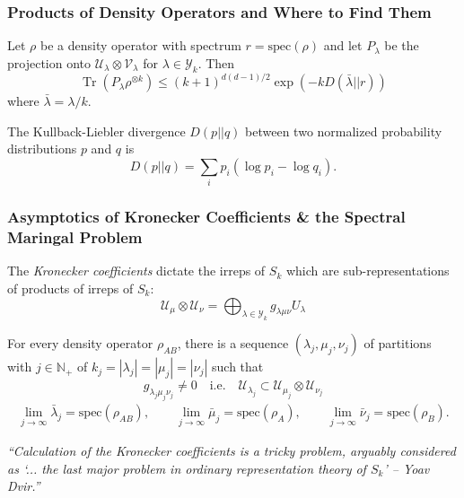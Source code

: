\documentclass[
    9pt,
    hyperref={bookmarks=false, colorlinks=false}, %
    xcolor={dvipsnames},
]{beamer}
\DeclareMathOperator{\Tr}{Tr}
\begin{document}
\begin{frame}
    \frametitle{Products of Density Operators and Where to Find Them}
    \begin{theorem}
        Let $\rho$ be a density operator with spectrum $r = \mathrm{spec}(\rho)$ and let $P_\lambda$ be the projection onto $\mathcal U_\lambda \otimes \mathcal V_\lambda$ for $\lambda \in \mathcal Y_k$. Then
        \[ \Tr ( P_\lambda \rho^{\otimes k} ) \leq (k + 1)^{d(d-1)/2} \exp ( - k D(\bar \lambda || r  )) \]
        where $\bar \lambda = \lambda / k$.
    \end{theorem}
    \begin{definition}[KL Divergence]
        The Kullback-Liebler divergence $D(p ||q)$ between two normalized probability distributions $p$ and $q$ is
        \[ D(p || q) = {\sum}_{i} p_i ( \log p_i - \log q_i ). \]
    \end{definition}
\end{frame}

\begin{frame}
    \frametitle{Asymptotics of Kronecker Coefficients \& the Spectral Maringal Problem}
    \begin{definition}
        The \textit{Kronecker coefficients} dictate the irreps of $S_k$ which are sub-representations of products of irreps of $S_k$:
        \[ \mathcal U_{\mu} \otimes \mathcal U_{\nu}  = {\bigoplus}_{\lambda \in \mathcal Y_k} g_{\lambda \mu \nu} U_{\lambda} \]
    \end{definition}
    \begin{theorem}
        For every density operator $\rho_{AB}$, there is a sequence $(\lambda_j, \mu_j, \nu_j)$ of partitions with $j \in \mathbb N_+$ of $k_j = |\lambda_j| = |\mu_j| = |\nu_j|$ such that 
        \[ g_{\lambda_j \mu_j \nu_j} \neq 0 \quad \text{i.e.} \quad \mathcal U_{\lambda_j} \subset \mathcal U_{\mu_j} \otimes \mathcal U_{\nu_j} \]
        \begin{align*}
            \lim_{j\to \infty} \bar \lambda_j = \mathrm{spec}(\rho_{AB}), \qquad 
            \lim_{j\to \infty} \bar \mu_j = \mathrm{spec}(\rho_{A}), \qquad
            \lim_{j\to \infty} \bar \nu_j = \mathrm{spec}(\rho_{B}).
        \end{align*}
    \end{theorem}
    \begin{alertblock}{}
        \textit{``Calculation of the Kronecker coefficients is a tricky problem, arguably considered as `... the last major problem in ordinary representation theory of $S_k$' -- Yoav Dvir.''}
        \hspace*{}
    \end{alertblock}
\end{frame}
\end{document}
